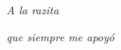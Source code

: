 \thispagestyle{empty}

\bigskip

\begin{flushright}

\vspace*{7cm}

	\textit{A la razita}
	
	\textit{que siempre me apoyó}

\vspace*{\fill}

\end{flushright}

\newpage
\thispagestyle{empty}
\cleardoublepage